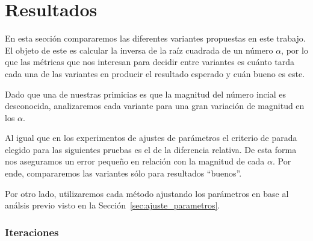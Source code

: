 \section{Resultados}


En esta sección compararemos las diferentes variantes propuestas en este
trabajo. El objeto de este es calcular la inversa de la raíz cuadrada de un
número $\alpha$, por lo que las métricas que nos interesan para decidir entre
variantes es cuánto tarda cada una de las variantes en producir el resultado
esperado y cuán bueno es este.

Dado que una de nuestras primicias es que la magnitud del número incial es
desconocida, analizaremos cada variante para una gran variación de magnitud en
los $\alpha$.

Al igual que en los experimentos de ajustes de parámetros el criterio de parada
elegido para las siguientes pruebas es el de la diferencia relativa. De esta
forma nos aseguramos un error pequeño en relación con la magnitud de cada
$\alpha$. Por ende, compararemos las variantes sólo para resultados ``buenos''.

Por otro lado, utilizaremos cada método ajustando los parámetros en base al
análsis previo visto en la Sección~\ref{sec:ajuste_parametros}.

\subsubsection{Iteraciones}

